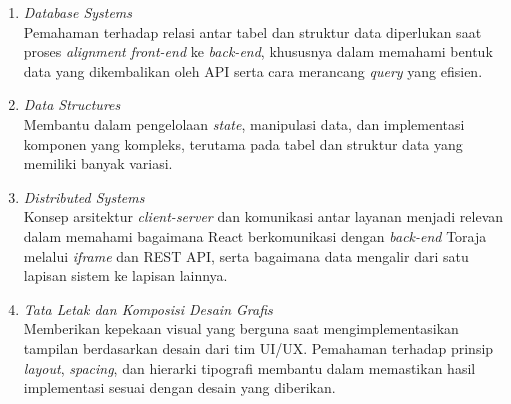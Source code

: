 \begin{enumerate}
      \item \textit{Database Systems}\\ Pemahaman terhadap relasi antar tabel dan struktur data
            diperlukan saat proses \textit{alignment} \textit{front-end} ke \textit{back-end}, khususnya dalam memahami
            bentuk data yang dikembalikan oleh API serta cara merancang \textit{query} yang efisien.

      \item \textit{Data Structures}\\ Membantu dalam pengelolaan \textit{state}, manipulasi data, dan
            implementasi komponen yang kompleks, terutama pada tabel dan struktur data
            yang memiliki banyak variasi.

      \item \textit{Distributed Systems}\\ Konsep arsitektur \textit{client-server} dan komunikasi antar
            layanan menjadi relevan dalam memahami bagaimana React berkomunikasi dengan
            \textit{back-end} Toraja melalui \textit{iframe} dan REST API, serta bagaimana data mengalir dari
            satu lapisan sistem ke lapisan lainnya.

      \item \textit{Tata Letak dan Komposisi Desain Grafis}\\ Memberikan kepekaan visual yang
            berguna saat mengimplementasikan tampilan berdasarkan desain dari tim UI/UX.
            Pemahaman terhadap prinsip \textit{layout}, \textit{spacing}, dan hierarki tipografi membantu
            dalam memastikan hasil implementasi sesuai dengan desain yang diberikan.

\end{enumerate}